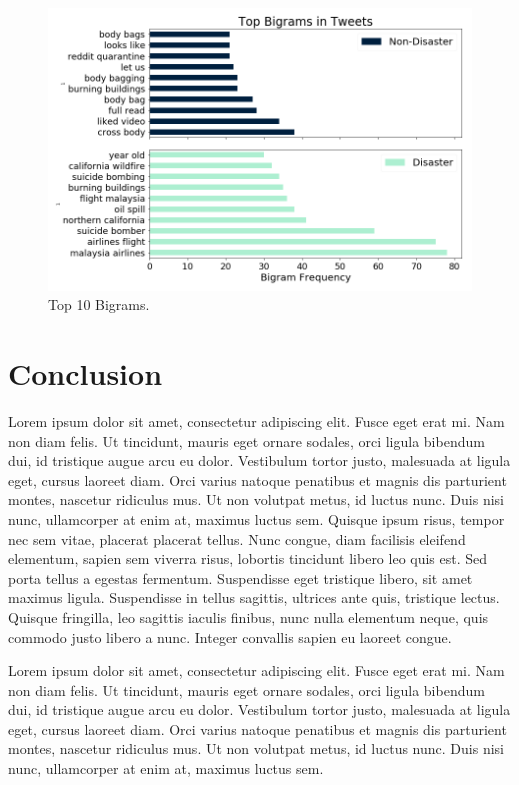 \documentclass[journal, ]{IEEEtran}
\let\MYoriglatexcaption\caption
\renewcommand{\caption}[2][\relax]{\MYoriglatexcaption[#2]{#2}}
\begin{document}
\begin{figure}[hbt!]
  \centering
  \includegraphics[width=\linewidth]{../figures/ngrams.png}
  \caption{Top 10 Bigrams.}
  \label{fig:ngram}
\end{figure}

\section{Conclusion}
Lorem ipsum dolor sit amet, consectetur adipiscing elit. Fusce eget erat mi.
Nam non diam felis. Ut tincidunt, mauris eget ornare sodales, orci ligula
bibendum dui, id tristique augue arcu eu dolor. Vestibulum tortor justo,
malesuada at ligula eget, cursus laoreet diam. Orci varius natoque penatibus et
magnis dis parturient montes, nascetur ridiculus mus. Ut non volutpat metus, id
luctus nunc. Duis nisi nunc, ullamcorper at enim at, maximus luctus sem.
Quisque ipsum risus, tempor nec sem vitae, placerat placerat tellus. Nunc
congue, diam facilisis eleifend elementum, sapien sem viverra risus, lobortis
tincidunt libero leo quis est. Sed porta tellus a egestas fermentum.
Suspendisse eget tristique libero, sit amet maximus ligula. Suspendisse in
tellus sagittis, ultrices ante quis, tristique lectus. Quisque fringilla, leo
sagittis iaculis finibus, nunc nulla elementum neque, quis commodo justo libero
a nunc. Integer convallis sapien eu laoreet congue.

Lorem ipsum dolor sit amet, consectetur adipiscing elit. Fusce eget erat mi.
Nam non diam felis. Ut tincidunt, mauris eget ornare sodales, orci ligula
bibendum dui, id tristique augue arcu eu dolor. Vestibulum tortor justo,
malesuada at ligula eget, cursus laoreet diam. Orci varius natoque penatibus et
magnis dis parturient montes, nascetur ridiculus mus. Ut non volutpat metus, id
luctus nunc. Duis nisi nunc, ullamcorper at enim at, maximus luctus sem.
\end{document}
